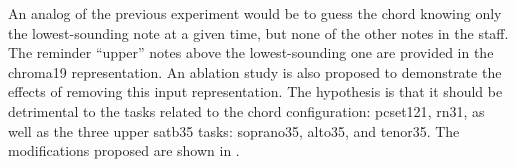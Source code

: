 
An analog of the previous experiment would be to guess the
chord knowing only the lowest-sounding note at a given time,
but none of the other notes in the staff. The reminder
``upper'' notes above the lowest-sounding one are provided
in the \gls{chroma19} representation. An ablation study is
also proposed to demonstrate the effects of removing this
input representation. The hypothesis is that it should be
detrimental to the tasks related to the chord configuration:
\gls{pcset121}, \gls{rn31}, as well as the three upper
\gls{satb35} tasks: \gls{soprano35}, \gls{alto35}, and
\gls{tenor35}. The modifications proposed are shown in
.


